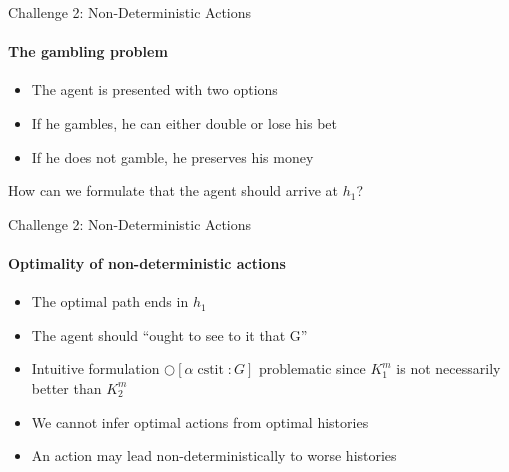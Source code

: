 \documentclass[usenames,dvipsnames]{beamer}
\newcommand{\cstit}{\operatorname{cstit}}
\begin{document}
	\begin{frame}{Challenge 2: Non-Deterministic Actions}
		\framesubtitle{The gambling problem}
		\begin{itemize}
		    \item The agent is presented with two options
		    \item If he gambles, he can either double or lose his bet
		    \item If he does not gamble, he preserves his money
		\end{itemize}
		\pause
		\begin{figure}[ht]
            \centering
        \end{figure}
        How can we formulate that the agent should arrive at $h_1$?
	\end{frame}
	
	\begin{frame}{Challenge 2: Non-Deterministic Actions}
		\framesubtitle{Optimality of non-deterministic actions}
		\begin{itemize}
		    \item The optimal path ends in $h_1$
		    \item The agent should \enquote{ought to see to it that G}
		    \item Intuitive formulation $\bigcirc[\alpha \cstit \colon G]$ problematic since $K_1^m$ is not necessarily better than $K_2^m$\pause
		    \item We cannot infer optimal actions from optimal histories
		    \item An action may lead non-deterministically to worse histories
		\end{itemize}
	\end{frame}
	
\end{document}
